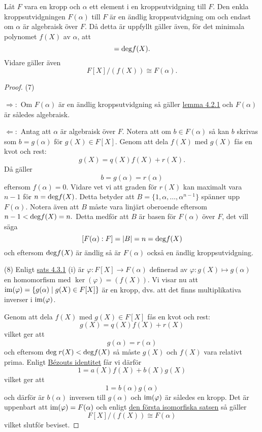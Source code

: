 \documentclass{article}
\newcommand{\grad}[0]{\textnormal{deg}}
\newcommand{\im}[0]{\textnormal{im}}
\theoremstyle{definition}
\begin{document}
\hypertarget{5.3.2}{}
\begin{mytheo}{}{}
  Låt $F$ vara en kropp och $\alpha$ ett element i en kroppsutvidgning till $F$. Den enkla kroppsutvidgningen $F(\alpha)$ till $F$ är en 
  ändlig kroppsutvidgning om och endast om $\alpha$ är algebraisk över $F$. Då detta är uppfyllt gäller även, för det minimala polynomet $f(X)$ av $\alpha$, att
  \begin{equation}
    [F(\alpha) : F] = \grad f(X).
  \end{equation}
  Vidare gäller även 
  \begin{equation}
    F[X]/(f(X)) \cong F(\alpha).
  \end{equation}
\end{mytheo}
\begin{proof}
  (7) 
  
  $\Rightarrow:$ Om $F(\alpha)$ är en ändlig kroppsutvidgning så gäller \hyperlink{algebraiskkropp}{lemma 4.2.1} och $F(\alpha)$ är således algebraisk. 
  
  $\Leftarrow:$ Antag att $\alpha$ är algebraisk över $F$. Notera att om $b \in F(\alpha)$ så kan $b$ skrivas som $b = g(\alpha)$ för $g(X) \in F[X].$
  Genom att dela $f(X)$ med $g(X)$ fås en kvot och rest: 
  \[g(X) = q(X)f(X) + r(X).\]
  Då gäller 
  \[b = g(\alpha) = r(\alpha)\]
  eftersom $f(\alpha) = 0$. Vidare vet vi att graden för $r(X)$ kan maximalt vara $n-1$ för $n = \grad f(X)$. Detta betyder att $B = \{1, \alpha, \ldots, \alpha^{n-1}\}$
  spänner upp $F(\alpha)$. Notera även att $B$ måste vara linjärt oberoende eftersom $n-1 < \grad f(X) = n.$ Detta medför att $B$ är basen för $F(\alpha)$ över $F$, 
  det vill säga 
  \[ [F(\alpha): F] = |B| = n = \grad f(X) \]
  och eftersom $\grad f(X)$ är ändlig så är $F(\alpha)$ också en ändlig kroppsutvidgning. 

  (8) Enligt \hyperlink{minpol}{sats 4.3.1} (i) är $\varphi: F[X] \rightarrow F(\alpha)$ definerad av $\varphi: g(X) \mapsto g(\alpha)$ 
  en homomorfism med $\ker(\varphi) = (f(X)).$ Vi visar nu att $\im(\varphi) = \{g(\alpha) \; | \; g(X) \in F[X]\}$ är en kropp, 
  dvs. att det finns multiplikativa inverser i $\im(\varphi)$. 

  Genom att dela $f(X)$ med $g(X) \in F[X]$ fås en kvot och rest: 
  \[g(X) = q(X)f(X) + r(X)\]
  vilket ger att 
  \[g(\alpha) = r(\alpha)\]
  och eftersom $\grad \; r(X) < \grad f(X)$ så måste $g(X)$ och $f(X)$ vara relativt prima. Enligt \hyperlink{Bezouts identitet}{Bézouts identitet}
  får vi därför 
  \[1 = a(X)f(X) + b(X)g(X)\]
  vilket ger att 
  \[1 = b(\alpha)g(\alpha)\]
  och därför är $b(\alpha)$ inversen till $g(\alpha)$ och $\im(\varphi)$ är således en kropp. Det är uppenbart att $\im(\varphi) = F(\alpha)$
  och enligt \hyperlink{isomorfiska}{den första isomorfiska satsen} så gäller 
  \[F[X]/(f(X)) \cong F(\alpha)\]
  vilket slutför beviset.
\end{proof}
\end{document}
